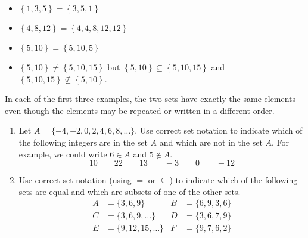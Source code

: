 \begin{multicols}{2}
\begin{itemize}
\item $\left\{ {1, 3, 5} \right\} = \left\{ {3, 5, 1} \right\}$

\item $\left\{ {4, 8, 12} \right\} = \left\{ {4, 4, 8, 12, 12} \right\}$

\item $\left\{ {5, 10} \right\} = \left\{ {5, 10, 5} \right\}$
\end{itemize}
\end{multicols}
\begin{itemize}
\item $\left\{ {5, 10} \right\} \ne \left\{ {5, 10, 15} \right\}$ but 
$\left\{ {5, 10} \right\} \subseteq \left\{ {5, 10, 15} \right\}$ and 
$\left\{ {5, 10, 15} \right\} \not \subseteq \left\{ {5, 10} \right\}$.
\end{itemize}
In each of the first three examples, the two sets have exactly the same elements even though the elements may be repeated or written in a different order.
\hbreak

\begin{prog}\label{pr:setnotation} \hfill
\begin{enumerate}
  \item Let $A = \{ -4, -2, 0, 2, 4, 6, 8, \ldots \}$.  Use correct set notation to indicate which of the following integers are in the set $A$ and which are not in the set $A$.  For example, we could write $6 \in A$ and $5 \notin A$.
\[
10 \qquad 22 \qquad 13 \qquad -3  \qquad 0 \qquad -12
\]
  \item Use correct set notation (using $=$ or $\subseteq$) to indicate which of the following sets are equal and which are subsets of one of the other sets.
\begin{align*}
A &= \{3, 6, 9 \} & B &= \{6, 9, 3, 6 \} \\
C &= \{3, 6, 9, \ldots \} & D &= \{ 3, 6, 7, 9 \} \\
E &= \{9, 12, 15, \ldots \} & F &= \{9, 7, 6, 2 \}
\end{align*}
\end{enumerate}
\end{prog}
\hbreak

\endinput
